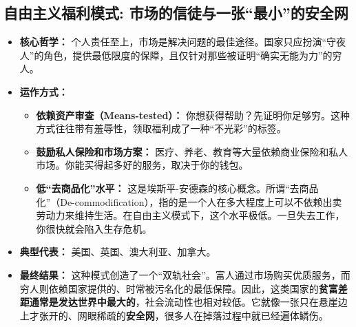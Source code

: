 \documentclass[a5paper, 11pt, openany]{ctexbook}
\begin{document}
\subsection{自由主义福利模式: 市场的信徒与一张“最小”的安全网}
\begin{itemize}
    \item \textbf{核心哲学：} 个人责任至上，市场是解决问题的最佳途径。国家只应扮演“守夜人”的角色，提供最低限度的保障，且仅针对那些被证明“确实无能为力”的穷人。
    \item \textbf{运作方式：}
    \begin{itemize}
        \item \textbf{依赖资产审查（Means-tested）：} 你想获得帮助？先证明你足够穷。这种方式往往带有羞辱性，领取福利成了一种“不光彩”的标签。
        \item \textbf{鼓励私人保险和市场方案：} 医疗、养老、教育等大量依赖商业保险和私人市场。你能买得起多好的服务，取决于你的钱包。
        \item \textbf{低“去商品化”水平：} 这是埃斯平-安德森的核心概念。所谓“去商品化”（De-commodification），指的是一个人在多大程度上可以不依赖出卖劳动力来维持生活。在自由主义模式下，这个水平极低。一旦失去工作，你很快就会陷入生存危机。
    \end{itemize}
    \item \textbf{典型代表：} 美国、英国、澳大利亚、加拿大。
    \item \textbf{最终结果：} 这种模式创造了一个“双轨社会”。富人通过市场购买优质服务，而穷人则依赖国家提供的、时常被污名化的最低保障。因此，这类国家的\textbf{贫富差距通常是发达世界中最大的}，社会流动性也相对较低。它就像一张只在悬崖边上才张开的、网眼稀疏的\textbf{安全网}，很多人在掉落过程中就已经遍体鳞伤。
\end{itemize}
\end{document}
